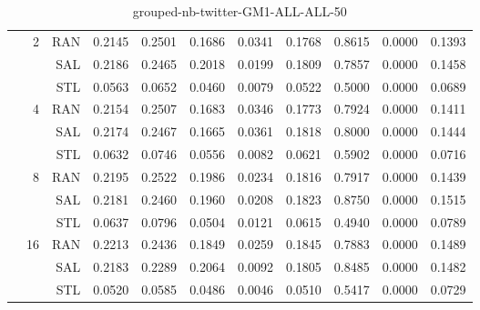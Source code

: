 \begin{center}
\begin{table}[htbp]
\begin{tabular}{ | r | r | r | r | r | r | r | r | r | r | r |}
 & \multirow{3}{*}{2} & RAN & 0.2145 & 0.2501 & 0.1686 & 0.0341 & 0.1768 & 0.8615 & 0.0000 & 0.1393\\ \cline{3-11}
 &   & SAL & 0.2186 & 0.2465 & 0.2018 & 0.0199 & 0.1809 & 0.7857 & 0.0000 & 0.1458\\ \cline{3-11}
 &   & STL & 0.0563 & 0.0652 & 0.0460 & 0.0079 & 0.0522 & 0.5000 & 0.0000 & 0.0689\\ \cline{2-11}
 & \multirow{3}{*}{4} & RAN & 0.2154 & 0.2507 & 0.1683 & 0.0346 & 0.1773 & 0.7924 & 0.0000 & 0.1411\\ \cline{3-11}
 &   & SAL & 0.2174 & 0.2467 & 0.1665 & 0.0361 & 0.1818 & 0.8000 & 0.0000 & 0.1444\\ \cline{3-11}
 &   & STL & 0.0632 & 0.0746 & 0.0556 & 0.0082 & 0.0621 & 0.5902 & 0.0000 & 0.0716\\ \cline{2-11}
 & \multirow{3}{*}{8} & RAN & 0.2195 & 0.2522 & 0.1986 & 0.0234 & 0.1816 & 0.7917 & 0.0000 & 0.1439\\ \cline{3-11}
 &   & SAL & 0.2181 & 0.2460 & 0.1960 & 0.0208 & 0.1823 & 0.8750 & 0.0000 & 0.1515\\ \cline{3-11}
 &   & STL & 0.0637 & 0.0796 & 0.0504 & 0.0121 & 0.0615 & 0.4940 & 0.0000 & 0.0789\\ \cline{2-11}
 & \multirow{3}{*}{16} & RAN & 0.2213 & 0.2436 & 0.1849 & 0.0259 & 0.1845 & 0.7883 & 0.0000 & 0.1489\\ \cline{3-11}
 &   & SAL & 0.2183 & 0.2289 & 0.2064 & 0.0092 & 0.1805 & 0.8485 & 0.0000 & 0.1482\\ \cline{3-11}
 &   & STL & 0.0520 & 0.0585 & 0.0486 & 0.0046 & 0.0510 & 0.5417 & 0.0000 & 0.0729\\ \cline{2-11}
\hline
\end{tabular}
\caption{grouped-nb-twitter-GM1-ALL-ALL-50}
\end{table}
\end{center}

